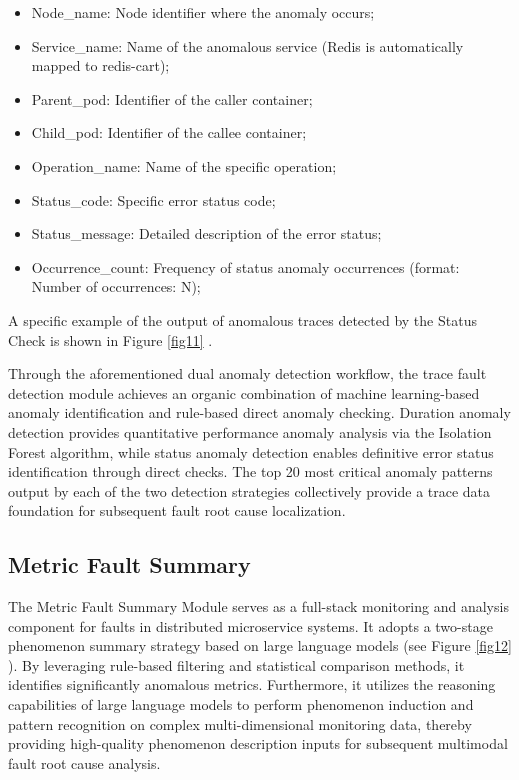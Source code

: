 \documentclass[10pt]{article}
\let\oldref\ref
\renewcommand{\ref}[1]{%
    \textcolor{blue}{\oldref{#1}}%
}
\begin{document}
\begin{itemize}
    \item Node\_name: Node identifier where the anomaly occurs;
    \item Service\_name: Name of the anomalous service (Redis is automatically mapped to redis-cart);
    \item Parent\_pod: Identifier of the caller container;
    \item Child\_pod: Identifier of the callee container;
    \item Operation\_name: Name of the specific operation;
    \item Status\_code: Specific error status code;
    \item Status\_message: Detailed description of the error status;
    \item Occurrence\_count: Frequency of status anomaly occurrences (format: Number of occurrences: N);
\end{itemize}

A specific example of the output of anomalous traces detected by the Status Check is shown in Figure \ref{fig11}.

Through the aforementioned dual anomaly detection workflow, the trace fault detection module achieves an organic combination of machine learning-based anomaly identification and rule-based direct anomaly checking. Duration anomaly detection provides quantitative performance anomaly analysis via the Isolation Forest algorithm, while status anomaly detection enables definitive error status identification through direct checks. The top 20 most critical anomaly patterns output by each of the two detection strategies collectively provide a trace data foundation for subsequent fault root cause localization.

\subsection{Metric Fault Summary}

The Metric Fault Summary Module serves as a full-stack monitoring and analysis component for faults in distributed microservice systems. It adopts a two-stage phenomenon summary strategy based on large language models (see Figure \ref{fig12}). By leveraging rule-based filtering and statistical comparison methods, it identifies significantly anomalous metrics. Furthermore, it utilizes the reasoning capabilities of large language models to perform phenomenon induction and pattern recognition on complex multi-dimensional monitoring data, thereby providing high-quality phenomenon description inputs for subsequent multimodal fault root cause analysis.
\end{document}
